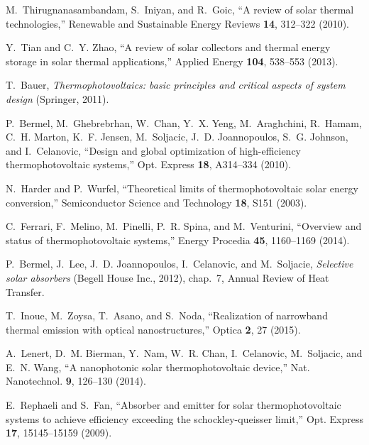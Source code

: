 \documentclass[10pt,letterpaper]{article}
\begin{document}
\providecommand{\noopsort}[1]{}\providecommand{\singleletter}[1]{#1}%
\begin{thebibliography}{100}
\newcommand{\enquote}[1]{``#1''}

M.~Thirugnanasambandam, S.~Iniyan, and R.~Goic, \enquote{A review of solar
  thermal technologies,} Renewable and Sustainable Energy Reviews \textbf{14},
  312--322 (2010).

Y.~Tian and C.~Y. Zhao, \enquote{A review of solar collectors and thermal
  energy storage in solar thermal applications,} Applied Energy \textbf{104},
  538--553 (2013).

T.~Bauer, \emph{Thermophotovoltaics: basic principles and critical aspects of
  system design} (Springer, 2011).

P.~Bermel, M.~Ghebrebrhan, W.~Chan, Y.~X. Yeng, M.~Araghchini, R.~Hamam, C.~H.
  Marton, K.~F. Jensen, M.~Soljacic, J.~D. Joannopoulos, S.~G. Johnson, and
  I.~Celanovic, \enquote{Design and global optimization of high-efficiency
  thermophotovoltaic systems,} Opt. Express \textbf{18}, A314--334 (2010).

N.~Harder and P.~Wurfel, \enquote{Theoretical limits of thermophotovoltaic
  solar energy conversion,} Semiconductor Science and Technology \textbf{18},
  S151 (2003).

C.~Ferrari, F.~Melino, M.~Pinelli, P.~R. Spina, and M.~Venturini,
  \enquote{Overview and status of thermophotovoltaic systems,} Energy Procedia
  \textbf{45}, 1160--1169 (2014).

P.~Bermel, J.~Lee, J.~D. Joannopoulos, I.~Celanovic, and M.~Soljacie,
  \emph{Selective solar absorbers} (Begell House Inc., 2012), chap.~7, Annual
  Review of Heat Transfer.

T.~Inoue, M.~Zoysa, T.~Asano, and S.~Noda, \enquote{Realization of narrowband
  thermal emission with optical nanostructures,} Optica \textbf{2}, 27 (2015).

A.~Lenert, D.~M. Bierman, Y.~Nam, W.~R. Chan, I.~Celanovic, M.~Soljacic, and
  E.~N. Wang, \enquote{A nanophotonic solar thermophotovoltaic device,} Nat.
  Nanotechnol. \textbf{9}, 126--130 (2014).

E.~Rephaeli and S.~Fan, \enquote{Absorber and emitter for solar
  thermophotovoltaic systems to achieve efficiency exceeding the
  schockley-queisser limit,} Opt. Express \textbf{17}, 15145--15159 (2009).


\end{thebibliography}
\end{document}
